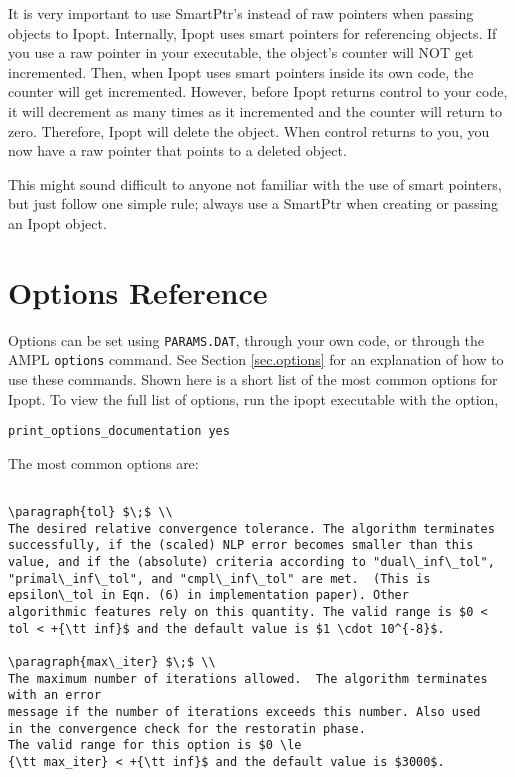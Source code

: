 \documentclass[letter,10pt]{article}
\begin{document}
{It is very important to use SmartPtr's instead of raw pointers when
passing objects to Ipopt. Internally, Ipopt uses smart pointers for
referencing objects. If you use a raw pointer in your executable, the
object's counter will NOT get incremented. Then, when Ipopt uses smart
pointers inside its own code, the counter will get
incremented. However, before Ipopt returns control to your code, it
will decrement as many times as it incremented and the counter will
return to zero. Therefore, Ipopt will delete the object. When control
returns to you, you now have a raw pointer that points to a deleted
object.

This might sound difficult to anyone not familiar with the use of
smart pointers, but just follow one simple rule; always use a SmartPtr
when creating or passing an Ipopt object.

\section{Options Reference} \label{app.options_ref}
Options can be set using {\tt PARAMS.DAT}, through your own code, or through the 
AMPL {\tt options} command. See Section \ref{sec.options} for an explanation of
how to use these commands.
Shown here is a short list of the most common options for Ipopt. To view
the full list of options, run the ipopt executable with the option,
\begin{verbatim}
print_options_documentation yes
\end{verbatim}

The most common options are:





\begin{verbatim}

\paragraph{tol} $\;$ \\
The desired relative convergence tolerance. The algorithm terminates
successfully, if the (scaled) NLP error becomes smaller than this
value, and if the (absolute) criteria according to "dual\_inf\_tol",
"primal\_inf\_tol", and "cmpl\_inf\_tol" are met.  (This is
epsilon\_tol in Eqn. (6) in implementation paper). Other
algorithmic features rely on this quantity. The valid range is $0 <
tol < +{\tt inf}$ and the default value is $1 \cdot 10^{-8}$.

\paragraph{max\_iter} $\;$ \\
The maximum number of iterations allowed.  The algorithm terminates with an error
message if the number of iterations exceeds this number. Also used
in the convergence check for the restoratin phase. 
The valid range for this option is $0 \le
{\tt max_iter} < +{\tt inf}$ and the default value is $3000$.



\end{verbatim}}
\end{document}
